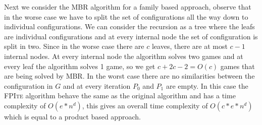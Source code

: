 Next we consider the \textsc{MBR} algorithm for a family based approach, observe that in the worse case we have to split the set of configurations all the way down to individual configurations. We can consider the recursion as a tree where the leafs are individual configurations and at every internal node the set of configuration is split in two. Since in the worse case there are $c$ leaves, there are at most $c-1$ internal nodes. At every internal node the algorithm solves two games and at every leaf the algorithm solves 1 game, so we get $c + 2c - 2 = O(c)$ games that are being solved by \textsc{MBR}. In the worst case there are no similarities between the configuration in $G$ and at every iteration $P_0$ and $P_1$ are empty. In this case the \textsc{FPIte} algorithm behave the same as the original algorithm and has a time complexity of $O(e*n^d)$, this gives an overall time complexity of $O(c*e*n^d)$ which is equal to a product based approach.